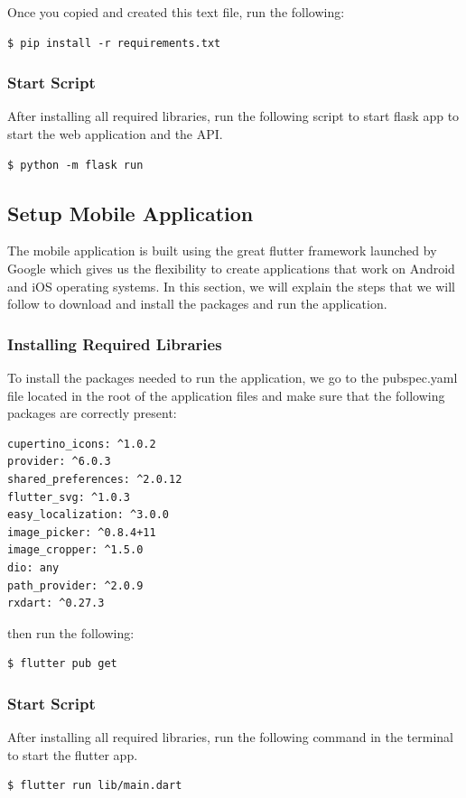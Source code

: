 \noindent
Once you copied and created this text file, run the following:

\begin{verbatim}
$ pip install -r requirements.txt
\end{verbatim}

\subsubsection{Start Script}
After installing all required libraries, run the following script to start flask app to start the web application and the API.

\begin{verbatim}
$ python -m flask run
\end{verbatim}

\subsection{Setup Mobile Application}
The mobile application is built using the great flutter framework launched by Google which gives us the flexibility to create applications that work on Android and iOS operating systems.
In this section, we will explain the steps that we will follow to download and install the packages and run the application.
\subsubsection{Installing Required Libraries}
To install the packages needed to run the application, we go to the pubspec.yaml file located in the root of the application files and make sure that the following packages are correctly present:
\begin{verbatim}
cupertino_icons: ^1.0.2
provider: ^6.0.3
shared_preferences: ^2.0.12
flutter_svg: ^1.0.3
easy_localization: ^3.0.0
image_picker: ^0.8.4+11
image_cropper: ^1.5.0
dio: any
path_provider: ^2.0.9
rxdart: ^0.27.3
\end{verbatim}
then run the following:
\begin{verbatim}
$ flutter pub get
\end{verbatim}

\subsubsection{Start Script}
After installing all required libraries, run the following command in the terminal to start the flutter app.

\begin{verbatim}
$ flutter run lib/main.dart
\end{verbatim}

